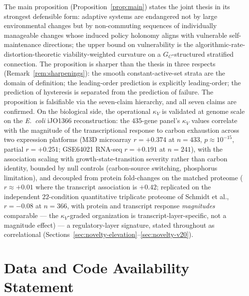\documentclass[11pt,a4paper]{article}
\theoremstyle{plain}
\theoremstyle{definition}
\theoremstyle{remark}
\newcommand{\kk}{\kappa_{\!V}}
\begin{document}
The main proposition (Proposition~\ref{prop:main}) states the joint
thesis in its strongest defensible form: adaptive systems are
endangered not by large environmental changes but by non-commuting
sequences of individually manageable changes whose induced policy
holonomy aligns with vulnerable self-maintenance directions; the upper
bound on vulnerability is the algorithmic-rate-distortion-theoretic
viability-weighted curvature on a $G_C$-structured stratified
connection. The proposition is sharper than the thesis in three
respects (Remark~\ref{rem:sharpenings}): the smooth constant-active-set
strata are the domain of definition; the leading-order prediction is
explicitly leading-order; the prediction of hysteresis is separated
from the prediction of failure. The proposition is falsifiable via the
seven-claim hierarchy, and all seven claims are confirmed.
On the biological side, the operational $\kk$ is validated at
genome scale on the \emph{E.~coli} iJO1366 reconstruction: the
$435$-gene panel's $\kk$ values correlate with the magnitude of the
transcriptional response to carbon exhaustion across two expression
platforms (M3D microarray $r = +0.374$ at $n = 433$,
$p \approx 10^{-15}$, partial $r = +0.251$; GSE64021 RNA-seq
$r = +0.191$ at $n = 241$), with the association scaling with
growth-state-transition severity rather than carbon identity,
bounded by null controls (carbon-source switching, phosphorus
limitation), and decoupled from protein fold-changes on the
matched proteome ($r \approx +0.01$ where the transcript
association is $+0.42$; replicated on the independent
$22$-condition quantitative triplicate proteome of Schmidt et
al., $r = -0.08$ at $n = 366$, with protein and transcript
response \emph{magnitudes} comparable --- the $\kk$-graded
organization is transcript-layer-specific, not a magnitude
effect) --- a regulatory-layer signature, stated throughout as
correlational
(Sections~\ref{sec:novelty-elevation}--\ref{sec:novelty-v20}).


\section*{Data and Code Availability Statement}
\label{sec:data-code}
\end{document}
